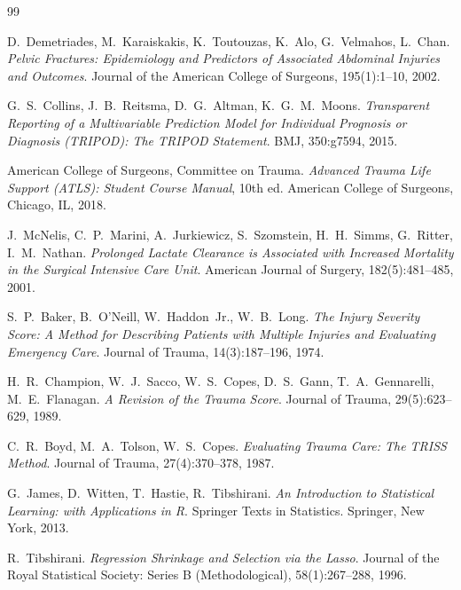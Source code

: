 \documentclass[11pt, oneside, noexaminfo]{sapthesis}   	%
\begin{document}
\backmatter
\begin{thebibliography}{99}

D.~Demetriades, M.~Karaiskakis, K.~Toutouzas, K.~Alo, G.~Velmahos, L.~Chan.
\textit{Pelvic Fractures: Epidemiology and Predictors of Associated Abdominal Injuries and Outcomes}.
Journal of the American College of Surgeons, 195(1):1--10, 2002.

G.~S.~Collins, J.~B.~Reitsma, D.~G.~Altman, K.~G.~M.~Moons.
\textit{Transparent Reporting of a Multivariable Prediction Model for Individual Prognosis or Diagnosis (TRIPOD): The TRIPOD Statement}.
BMJ, 350:g7594, 2015.

American College of Surgeons, Committee on Trauma.
\textit{Advanced Trauma Life Support (ATLS): Student Course Manual}, 10th ed.
American College of Surgeons, Chicago, IL, 2018.

J.~McNelis, C.~P.~Marini, A.~Jurkiewicz, S.~Szomstein, H.~H.~Simms, G.~Ritter, I.~M.~Nathan.
\textit{Prolonged Lactate Clearance is Associated with Increased Mortality in the Surgical Intensive Care Unit}.
American Journal of Surgery, 182(5):481--485, 2001.

S.~P.~Baker, B.~O'Neill, W.~Haddon~Jr., W.~B.~Long.
\textit{The Injury Severity Score: A Method for Describing Patients with Multiple Injuries and Evaluating Emergency Care}.
Journal of Trauma, 14(3):187--196, 1974.

H.~R.~Champion, W.~J.~Sacco, W.~S.~Copes, D.~S.~Gann, T.~A.~Gennarelli, M.~E.~Flanagan.
\textit{A Revision of the Trauma Score}.
Journal of Trauma, 29(5):623--629, 1989.

C.~R.~Boyd, M.~A.~Tolson, W.~S.~Copes.
\textit{Evaluating Trauma Care: The TRISS Method}.
Journal of Trauma, 27(4):370--378, 1987.

G.~James, D.~Witten, T.~Hastie, R.~Tibshirani.
\textit{An Introduction to Statistical Learning: with Applications in R}.
Springer Texts in Statistics. Springer, New York, 2013.

R.~Tibshirani.
\textit{Regression Shrinkage and Selection via the Lasso}.
Journal of the Royal Statistical Society: Series B (Methodological), 58(1):267--288, 1996.


\end{thebibliography}
\end{document}
